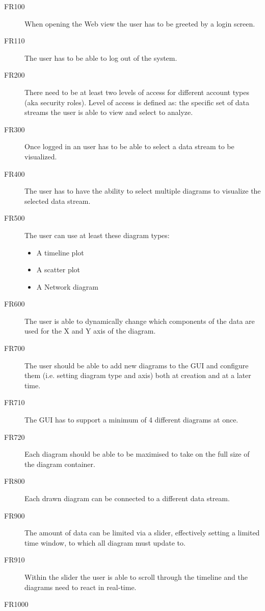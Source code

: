 \documentclass[twoside, english, draft]{Pflichtenheft}
\begin{document}
\begin{description}
	\item[FR100]
	      When opening the Web view the user has to be greeted by a login screen.
	\item[FR110]
	      The user has to be able to log out of the system.

	\item[FR200]
	      There need to be at least two levels of access for different account types (aka security \glspl{role}).
	      Level of access is defined as: the specific set of \glspl{data stream} the user is able to view and select to analyze.
	\item[FR300]
	      Once logged in an user has to be able to select a data stream to be visualized.
	\item[FR400]
	      The user has to have the ability to select multiple \glspl{diagram} to visualize the selected \gls{data stream}.
	\item[FR500]
	      The user can use at least these \glspl{diagram type}:
	      \begin{itemize}
		      \item{A timeline plot}
		      \item{A scatter plot}
		      \item{A Network diagram}
	      \end{itemize}
	\item[FR600]
	      The user is able to dynamically change which components of the data are used for the X and Y axis of the diagram.
	\item[FR700]
	      The user should be able to add new diagrams to the GUI and configure them (i.e. setting diagram type and axis) both at creation and at a later time.
	\item[FR710]
	      The GUI has to support a minimum of 4 different diagrams at once.
	\item[FR720]
	      Each diagram should be able to be maximised to take on the full size of the \gls{diagram container}.
	\item[FR800]
	      Each drawn diagram can be connected to a different data stream.
	\item[FR900]
	      The amount of data can be limited via a slider, effectively setting a limited time window, to which all diagram must update to.
	\item[FR910]
	      Within the slider the user is able to scroll through the timeline and the diagrams need to react in real-time.
	\item[FR1000]

\end{description}
\end{document}
